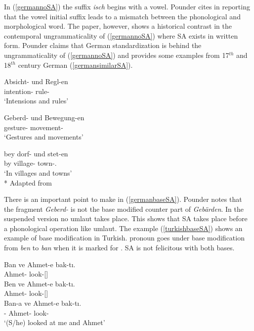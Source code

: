 In (\ref{germannoSA}) the suffix \textit{isch} begins with a vowel. Pounder cites \cite{booij1985coordination} in reporting that the vowel initial suffix leads to a mismatch between the phonological and morphological word. The paper, however, shows a historical contrast in the contemporal ungrammaticality of (\ref{germannoSA}) where SA exists in written form. Pounder claims that German standardization is behind the ungrammaticality of (\ref{germannoSA}) and provides some examples from 17$^{th}$ and 18$^{th}$ century German (\ref{germansimilarSA}).

\begin{exe}
    \ex \label{germansimilarSA}
    \begin{xlist}
        \ex \gll Absicht- und Regl-en \\ 
        intention- {\And} rule-{\Pl} \\
        \glt `Intensions and rules'
        
        \ex \label{germanbaseSA}
        \gll Geberd- und Bewegung-en \\ 
        gesture- {\And} movement-{\Pl} \\
        \glt `Gestures and movements'
        
        \ex \gll bey dorf- und stet-en \\ 
        by village- {\And} town-{\Pl}.{\Dat} \\
        \glt `In villages and towns'\\*
        \hfill Adapted from \cite{pounder2006broken}
    \end{xlist}
\end{exe}

There is an important point to make in (\ref{germanbaseSA}). Pounder notes that the fragment \textit{Geberd-} is not the base modified counter part of \textit{Geb\"{a}rden}. In the suspended version no umlaut takes place. This shows that SA takes place before a phonological operation like umlaut.
The example (\ref{turkishbaseSA}) shows an example of base modification in Turkish. {\Fsg} pronoun goes under base modification from \textit{ben} to \textit{ban} when it is marked for {\Dat}. SA is not felicitous with both bases.

\begin{exe}
    \ex \label{turkishbaseSA}
    \begin{xlist}
        \ex \gll *Ban ve Ahmet-e bak-tı. \\ 
        {\Fsg} {\And} Ahmet-{\Dat} look-{\Pst}[{\Third}{\Sg}] \\
    
        \ex \gll *Ben ve Ahmet-e bak-tı. \\
        {\Fsg} {\And} Ahmet-{\Dat} look-{\Pst}[{\Third}{\Sg}] \\
        
        \ex \gll Ban-a ve Ahmet-e bak-tı. \\ 
        {\Fsg}-{\Dat} {\And} Ahmet-{\Dat} look-{\Pst}\\
        \glt `(S/he) looked at me and Ahmet'
    \end{xlist}
\end{exe}

